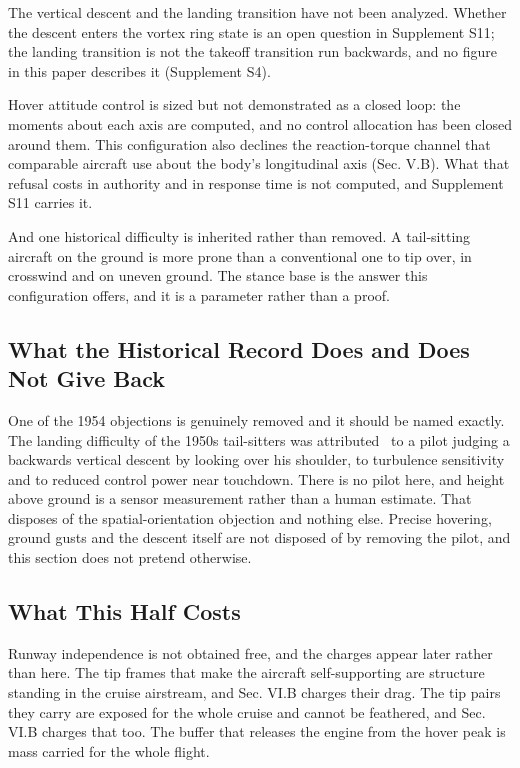 \documentclass[journal]{new-aiaa}
\begin{document}
The vertical descent and the landing transition have not been analyzed. Whether the descent enters the vortex ring state is an open question in Supplement S11; the landing transition is not the takeoff transition run backwards, and no figure in this paper describes it (Supplement S4).

Hover attitude control is sized but not demonstrated as a closed loop: the moments about each axis are computed, and no control allocation has been closed around them. This configuration also declines the reaction-torque channel that comparable aircraft use about the body's longitudinal axis (Sec. V.B). What that refusal costs in authority and in response time is not computed, and Supplement S11 carries it.

And one historical difficulty is inherited rather than removed. A tail-sitting aircraft on the ground is more prone than a conventional one to tip over, in crosswind and on uneven ground. The stance base is the answer this configuration offers, and it is a parameter rather than a proof.

\subsection{What the Historical Record Does and Does Not Give Back}

One of the 1954 objections is genuinely removed and it should be named exactly. The landing difficulty of the 1950s tail-sitters was attributed~\cite{r17} to a pilot judging a backwards vertical descent by looking over his shoulder, to turbulence sensitivity and to reduced control power near touchdown. There is no pilot here, and height above ground is a sensor measurement rather than a human estimate. That disposes of the spatial-orientation objection and nothing else. Precise hovering, ground gusts and the descent itself are not disposed of by removing the pilot, and this section does not pretend otherwise.

\subsection{What This Half Costs}

Runway independence is not obtained free, and the charges appear later rather than here. The tip frames that make the aircraft self-supporting are structure standing in the cruise airstream, and Sec. VI.B charges their drag. The tip pairs they carry are exposed for the whole cruise and cannot be feathered, and Sec. VI.B charges that too. The buffer that releases the engine from the hover peak is mass carried for the whole flight.
\end{document}
